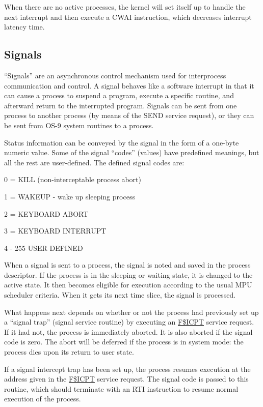 \documentclass[
]{article}
\begin{document}
When there are no active processes, the kernel will set itself up to
handle the next interrupt and then execute a CWAI instruction, which
decreases interrupt latency time.

\subsection{Signals}

``Signals'' are an asynchronous control mechanism used for interprocess
communication and control. A signal behaves like a software interrupt in
that it can cause a process to suspend a program, execute a specific
routine, and afterward return to the interrupted program. Signals can be
sent from one process to another process (by means of the SEND service
request), or they can be sent from OS-9 system routines to a process.

Status information can be conveyed by the signal in the form of a
one-byte numeric value. Some of the signal ``codes'' (values) have
predefined meanings, but all the rest are user-defined. The defined
signal codes are:

0 = KILL (non-interceptable process abort)

1 = WAKEUP - wake up sleeping process

2 = KEYBOARD ABORT

3 = KEYBOARD INTERRUPT

4 - 255 USER DEFINED

When a signal is sent to a process, the signal is noted and saved in the
process descriptor. If the process is in the sleeping or waiting state,
it is changed to the active state. It then becomes eligible for
execution according to the usual MPU scheduler criteria. When it gets
its next time slice, the signal is processed.

What happens next depends on whether or not the process had previously
set up a ``signal trap'' (signal service routine) by executing an
\hyperref[f.icpt]{F\$ICPT} service request. If it had not, the process
is immediately aborted. It is also aborted if the signal code is zero.
The abort will be deferred if the process is in system mode: the process
dies upon its return to user state.

If a signal intercept trap has been set up, the process resumes
execution at the address given in the \hyperref[f.icpt]{F\$ICPT} service
request. The signal code is passed to this routine, which should
terminate with an RTI instruction to resume normal execution of the
process.
\end{document}
